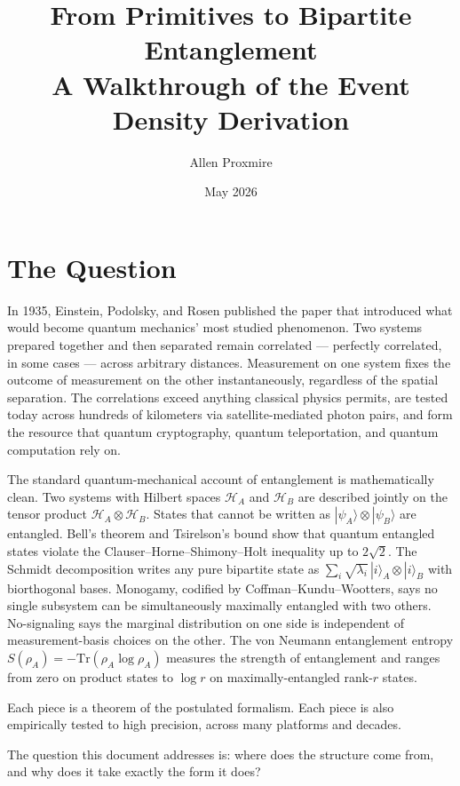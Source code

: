 \documentclass[11pt,a4paper]{article}
\title{\vspace{-1cm}\Large\bfseries From Primitives to Bipartite Entanglement\\[6pt]
\large\mdseries A Walkthrough of the Event Density Derivation}
\author{Allen Proxmire}
\date{May 2026}
\begin{document}
\maketitle
\thispagestyle{empty}

\section{The Question}

In 1935, Einstein, Podolsky, and Rosen published the paper that introduced what would become quantum mechanics' most studied phenomenon. Two systems prepared together and then separated remain correlated --- perfectly correlated, in some cases --- across arbitrary distances. Measurement on one system fixes the outcome of measurement on the other instantaneously, regardless of the spatial separation. The correlations exceed anything classical physics permits, are tested today across hundreds of kilometers via satellite-mediated photon pairs, and form the resource that quantum cryptography, quantum teleportation, and quantum computation rely on.

The standard quantum-mechanical account of entanglement is mathematically clean. Two systems with Hilbert spaces $\mathcal{H}_A$ and $\mathcal{H}_B$ are described jointly on the tensor product $\mathcal{H}_A \otimes \mathcal{H}_B$. States that cannot be written as $|\psi_A\rangle \otimes |\psi_B\rangle$ are entangled. Bell's theorem and Tsirelson's bound show that quantum entangled states violate the Clauser--Horne--Shimony--Holt inequality up to $2\sqrt{2}$. The Schmidt decomposition writes any pure bipartite state as $\sum_i \sqrt{\lambda_i}\, |i\rangle_A \otimes |i\rangle_B$ with biorthogonal bases. Monogamy, codified by Coffman--Kundu--Wootters, says no single subsystem can be simultaneously maximally entangled with two others. No-signaling says the marginal distribution on one side is independent of measurement-basis choices on the other. The von Neumann entanglement entropy $S(\rho_A) = -\mathrm{Tr}(\rho_A \log \rho_A)$ measures the strength of entanglement and ranges from zero on product states to $\log r$ on maximally-entangled rank-$r$ states.

Each piece is a theorem of the postulated formalism. Each piece is also empirically tested to high precision, across many platforms and decades.

The question this document addresses is: where does the structure come from, and why does it take exactly the form it does?
\end{document}

